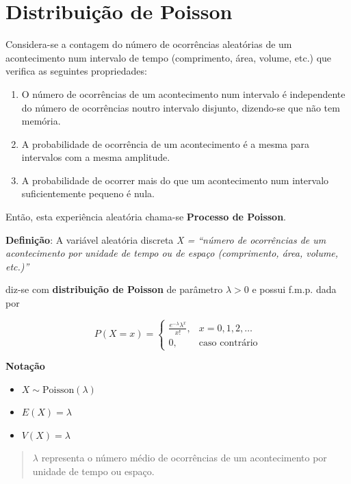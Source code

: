 \documentclass[
]{book}
\providecommand{\tightlist}{%
  \setlength{\itemsep}{0pt}\setlength{\parskip}{0pt}}
\begin{document}
\section{Distribuição de Poisson}\label{distribuiuxe7uxe3o-de-poisson}

Considera-se a contagem do número de ocorrências aleatórias de um acontecimento num intervalo de tempo (comprimento, área, volume, etc.) que verifica as seguintes propriedades:

\begin{enumerate}
\def\labelenumi{\arabic{enumi}.}
\item
  O número de ocorrências de um acontecimento num intervalo é independente do número de ocorrências noutro intervalo disjunto, dizendo-se que não tem memória.
\item
  A probabilidade de ocorrência de um acontecimento é a mesma para intervalos com a mesma amplitude.
\item
  A probabilidade de ocorrer mais do que um acontecimento num intervalo suficientemente pequeno é nula.
\end{enumerate}

Então, esta experiência aleatória chama-se \textbf{Processo de Poisson}.

\textbf{Definição}: A variável aleatória discreta \emph{X = ``número de ocorrências de um acontecimento por unidade de tempo ou de espaço (comprimento, área, volume, etc.)''}

diz-se com \textbf{distribuição de Poisson} de parâmetro \(\lambda > 0\) e possui f.m.p. dada por

\[
P(X = x) = \begin{cases} 
\frac{e^{-\lambda} \lambda^x}{x!}, & x = 0, 1, 2, \dots \\
0, & \text{caso contrário}
\end{cases}
\]

\textbf{Notação}

\begin{itemize}
\tightlist
\item
  \(X \sim \text{Poisson}(\lambda)\)
\item
  \(E(X) = \lambda\)
\item
  \(V(X) = \lambda\)
\end{itemize}

\begin{quote}
\(\lambda\) representa o número médio de ocorrências de um acontecimento por unidade de tempo ou espaço.
\end{quote}
\end{document}
